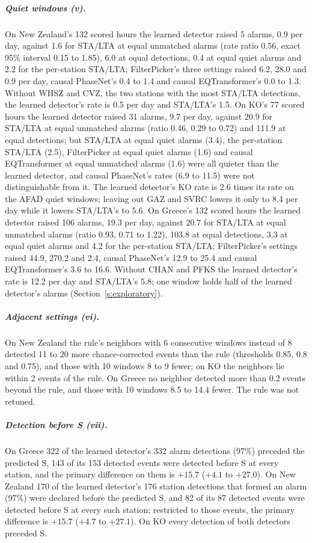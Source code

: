 \documentclass[11pt,a4paper]{article}
\newcommand{\stalta}{STA/LTA}
\begin{document}
\subparagraph{Quiet windows (v).} On New Zealand's 132 scored hours the learned detector
raised 5 alarms, 0.9 per day, against 1.6 for \stalta{} at equal unmatched alarms
(rate ratio 0.56, exact 95\% interval 0.15 to 1.85), 6.0 at equal detections, 0.4 at
equal quiet alarms and 2.2 for the per-station \stalta{}; FilterPicker's three
settings raised 6.2, 28.0 and 0.9 per day, causal PhaseNet's 0.4 to 1.4 and causal
EQTransformer's 0.0 to 1.3. Without WHSZ and CVZ, the two stations with the most
\stalta{} detections, the learned detector's rate is 0.5 per day and \stalta{}'s 1.5.
On KO's 77 scored hours the learned detector raised 31 alarms, 9.7 per day, against
20.9 for \stalta{} at equal unmatched alarms (ratio 0.46, 0.29 to 0.72) and 111.9 at
equal detections; but \stalta{} at equal quiet alarms (3.4), the per-station
\stalta{} (2.5), FilterPicker at equal quiet alarms (1.6) and causal EQTransformer at
equal unmatched alarms (1.6) were all quieter than the learned detector, and causal
PhaseNet's rates (6.9 to 11.5) were not distinguishable from it. The learned
detector's KO rate is 2.6 times its rate on the AFAD quiet windows; leaving out GAZ
and SVRC lowers it only to 8.4 per day while it lowers \stalta{}'s to 5.6.
On Greece's 132 scored hours the learned detector raised 106 alarms, 19.3 per day,
against 20.7 for \stalta{} at equal unmatched alarms (ratio 0.93, 0.71 to 1.22),
103.8 at equal detections, 3.3 at equal quiet alarms and 4.2 for the per-station
\stalta{}; FilterPicker's settings raised 44.9, 270.2 and 2.4, causal PhaseNet's 12.9
to 25.4 and causal EQTransformer's 3.6 to 16.6. Without CHAN and PFKS the learned
detector's rate is 12.2 per day and \stalta{}'s 5.8; one window holds half of the
learned detector's alarms (Section~\ref{s:exploratory}).

\subparagraph{Adjacent settings (vi).} On New Zealand the rule's neighbors with 6
consecutive windows instead of 8 detected 11 to 20 more chance-corrected events than
the rule (thresholds 0.85, 0.8 and 0.75), and those with 10 windows 8 to 9 fewer; on
KO the neighbors lie within 2 events of the rule. On Greece no neighbor detected more
than 0.2 events beyond the rule, and those with 10 windows 8.5 to 14.4 fewer. The rule
was not retuned.

\subparagraph{Detection before S (vii).} On Greece 322 of the learned detector's 332 alarm detections (97\%) preceded the predicted S, 143 of its 153 detected events were detected before S at every station, and the primary difference on them is $+15.7$ ($+4.1$ to $+27.0$). On New Zealand 170 of the learned detector's
176 station detections that formed an alarm (97\%) were declared before the predicted
S, and 82 of its 87 detected events were detected before S at every such station;
restricted to those events, the primary difference is $+15.7$ ($+4.7$ to $+27.1$). On
KO every detection of both detectors preceded S.
\end{document}

